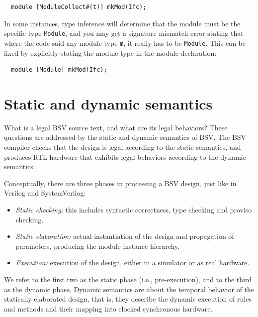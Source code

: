 \documentclass[twoside,letterpaper]{article}
\newcommand{\BSV}{BSV}
\newcommand{\SV}{SystemVerilog}
\newcommand{\V}{Verilog}
\newcommand{\te}[1]{\texttt{#1}}
\begin{document}
\begin{verbatim}
  module [ModuleCollect#(t)] mkMod(Ifc);
\end{verbatim}

  In some instances,
type inference will determine that the module must be the specific
type \te{Module}, and you may get a signature mismatch error stating
that where the code said any module type 
\te{m}, it really has to be \te{Module}.  This can be fixed by
explicitly stating the module type in the module declaration:

\begin{verbatim}
  module [Module] mkMod(Ifc);
\end{verbatim}


\section{Static and dynamic semantics}

What is a legal {\BSV} source text, and what are its legal behaviors?
These questions are addressed by the static and dynamic semantics of
{\BSV}.  The {\BSV} compiler checks that the design is legal according
to the static semantics, and produces RTL hardware that exhibits legal
behaviors according to the dynamic semantics.

Conceptually, there are three phases in processing a {\BSV} design,
just like in {\V} and {\SV}:
\begin{itemize}

\item
\emph{Static checking:} this includes syntactic correctness,
type checking and proviso checking.

\item
\emph{Static elaboration:}
actual instantiation of the
design and propagation of parameters, producing the module instance
hierarchy.

\item
\emph{Execution:} execution of the design, either in
a simulator or as real hardware.

\end{itemize}
We refer to the first two as the static phase (i.e., pre-execution),
and to the third as the dynamic phase.  Dynamic semantics are about
the temporal behavior of the statically elaborated design, that is,
they describe the dynamic execution of rules and methods and their
mapping into clocked synchronous hardware.
\end{document}
